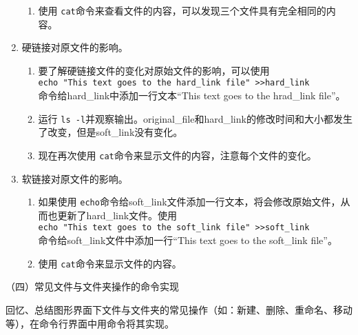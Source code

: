\begin{enumerate}
\begin{enumerate}
      \item 使用 \verb|cat|命令来查看文件的内容，可以发现三个文件具有完全相同的内容。
    \end{enumerate}
  \item 硬链接对原文件的影响。
    \begin{enumerate}
      \item 要了解硬链接文件的变化对原始文件的影响，可以使用\\ \verb|echo "This text goes to the hard_link file" >>hard_link| \\ 命令给hard\_link中添加一行文本“This text goes to the hrad\_link file”。
      \item 运行 \verb|ls -l|并观察输出。original\_file和hard\_link的修改时间和大小都发生了改变，但是soft\_link没有变化。
      \item 现在再次使用 \verb|cat|命令来显示文件的内容，注意每个文件的变化。
    \end{enumerate}
  \item 软链接对原文件的影响。
    \begin{enumerate}
      \item 如果使用 \verb|echo|命令给soft\_link文件添加一行文本，将会修改原始文件，从而也更新了hard\_link文件。使用\\ \verb|echo "This text goes to the soft_link file" >>soft_link| \\ 命令给soft\_link文件中添加一行“This text goes to the soft\_link file”。
      \item 使用 \verb|cat|命令来显示文件的内容。
    \end{enumerate}
\end{enumerate}

\vspace{0.1in}
（四）常见文件与文件夹操作的命令实现

回忆、总结图形界面下文件与文件夹的常见操作（如：新建、删除、重命名、移动等），在命令行界面中用命令将其实现。
